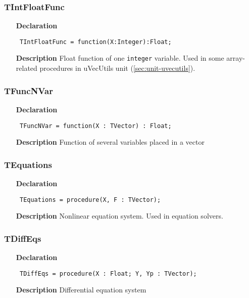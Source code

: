 \documentclass[12pt,a4paper,oneside]{report}
\newcommand{\lmath}[1]{   %
	\marginpar{\vspace{#1} 
		\begin{flushright}
			LMath
	\end{flushright} }
}
\newcommand{\declarationitem}[1]{\textbf{#1}}
\newcommand{\descriptiontitle}[1]{\textbf{#1}}
\newcommand{\code}[1]{\texttt{#1}}
\begin{document}
\subsubsection{TIntFloatFunc}
\label{utypes-TIntFloatFunc}
\begin{itemize}\item[\declarationitem{Declaration}\hfill]
	\begin{flushleft}
		\code{
			TIntFloatFunc     = function(X:Integer):Float;
		}
	\end{flushleft}
	\item[\descriptiontitle{Description}]
	Float function of one \code{integer} variable. Used in some array-related procedures in uVecUtils unit (\ref{sec:unit-uvecutils}).
\end{itemize}

\subsubsection{TFuncNVar}
\label{utypes-TFuncNVar}
\lmath{-24pt}
\begin{itemize}\item[\declarationitem{Declaration}\hfill]
	\begin{flushleft}
		\code{
			TFuncNVar = function(X : TVector) : Float;}
	\end{flushleft}
	\item[\descriptiontitle{Description}]
	Function of several variables placed in a vector
\end{itemize}

\subsubsection{TEquations}
\label{utypes-TEquations}
\begin{itemize}\item[\declarationitem{Declaration}\hfill]
	\begin{flushleft}
		\code{
			TEquations = procedure(X, F : TVector);}
	\end{flushleft}
	\item[\descriptiontitle{Description}]
	Nonlinear equation system. Used in equation solvers.
\end{itemize}
\subsubsection{TDiffEqs}
\label{utypes-TDiffEqs}
\begin{itemize}\item[\declarationitem{Declaration}\hfill]
	\begin{flushleft}
		\code{
			TDiffEqs = procedure(X : Float; Y, Yp : TVector);}
		
	\end{flushleft}
	
	\par
	\item[\descriptiontitle{Description}]
	Differential equation system
	
\end{itemize}
\end{document}
